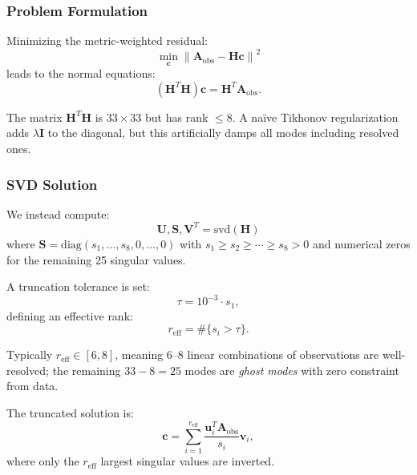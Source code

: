 \documentclass[11pt,a4paper]{article}
\begin{document}
\subsubsection{Problem Formulation}

Minimizing the metric-weighted residual:
\begin{equation}
\min_{\mathbf{c}} \left\| \mathbf{A}_{\mathrm{obs}} - \mathbf{H} \mathbf{c} \right\|^2
\end{equation}
leads to the normal equations:
\begin{equation}
\left( \mathbf{H}^T \mathbf{H} \right) \mathbf{c} = \mathbf{H}^T \mathbf{A}_{\mathrm{obs}}.
\label{eq:normal}
\end{equation}

The matrix $\mathbf{H}^T \mathbf{H}$ is $33 \times 33$ but has rank $\leq 8$. A na\"ive Tikhonov regularization adds $\lambda \mathbf{I}$ to the diagonal, but this artificially damps all modes including resolved ones.

\subsubsection{SVD Solution}

We instead compute:
\begin{equation}
\mathbf{U}, \mathbf{S}, \mathbf{V}^T = \text{svd}(\mathbf{H})
\label{eq:svd}
\end{equation}
where $\mathbf{S} = \text{diag}(s_1, \ldots, s_8, 0, \ldots, 0)$ with $s_1 \geq s_2 \geq \cdots \geq s_8 > 0$ and numerical zeros for the remaining 25 singular values.

A truncation tolerance is set:
\begin{equation}
\tau = 10^{-3} \cdot s_1,
\end{equation}
defining an effective rank:
\begin{equation}
r_{\mathrm{eff}} = \#\{s_i > \tau\}.
\end{equation}

Typically $r_{\mathrm{eff}} \in [6, 8]$, meaning 6--8 linear combinations of observations are well-resolved; the remaining $33 - 8 = 25$ modes are \emph{ghost modes} with zero constraint from data.

The truncated solution is:
\begin{equation}
\mathbf{c} = \sum_{i=1}^{r_{\mathrm{eff}}} \frac{\mathbf{u}_i^T \mathbf{A}_{\mathrm{obs}}}{s_i} \mathbf{v}_i,
\label{eq:svd_solution}
\end{equation}
where only the $r_{\mathrm{eff}}$ largest singular values are inverted.
\end{document}
